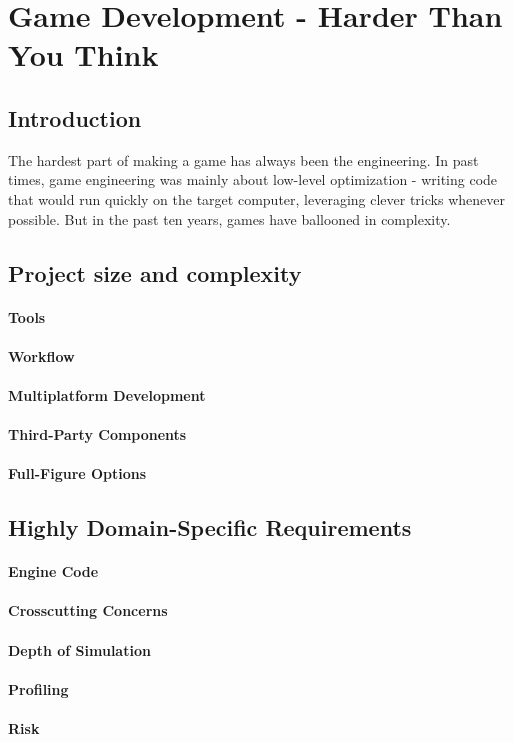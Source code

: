 \chapter*{Game Development - Harder Than You Think}
    
  \section*{Introduction}
  The hardest part of making a game has always been the engineering. In past times, game engineering was mainly about low-level optimization - writing code that would run quickly on the target computer, leveraging clever tricks whenever possible. But in the past ten years, games have ballooned in complexity. 

  \section*{Project size and complexity}

    \subsubsection*{Tools}

    \subsubsection*{Workflow}

    \subsubsection*{Multiplatform Development}

    \subsubsection*{Third-Party Components}

    \subsubsection*{Full-Figure Options}

  \section*{Highly Domain-Specific Requirements}

    \subsubsection*{Engine Code}

    \subsubsection*{Crosscutting Concerns}

    \subsubsection*{Depth of Simulation}

    \subsubsection*{Profiling}

    \subsubsection*{Risk}